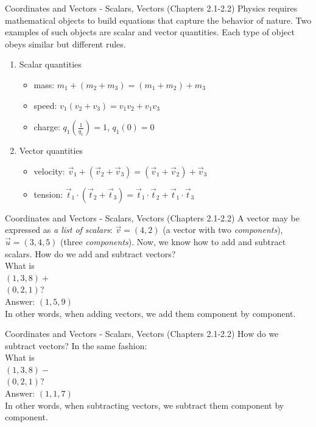 \documentclass{beamer}
\begin{document}
\begin{frame}{Coordinates and Vectors - Scalars, Vectors (Chapters 2.1-2.2)}
Physics requires \alert{mathematical objects} to build equations that capture the behavior of nature.  Two examples of such objects are \alert{scalar} and \alert{vector} quantities.  Each type of object obeys similar but different rules.
\begin{enumerate}
\item Scalar quantities
\begin{itemize}
\item mass: $m_1+(m_2+m_3) = (m_1+m_2)+m_3$
\item speed: $v_1(v_2+v_3) = v_1v_2+v_1v_3$
\item charge: $q_1 \left(\frac{1}{q_1}\right) = 1$, $q_1(0) = 0$
\end{itemize}
\item Vector quantities
\begin{itemize}
\item velocity: $\vec{v}_1 + (\vec{v}_2+\vec{v}_3) = (\vec{v}_1 + \vec{v}_2)+\vec{v}_3$
\item tension: $\vec{t}_1 \cdot (\vec{t}_2 + \vec{t}_3) = \vec{t}_1 \cdot \vec{t}_2 + \vec{t}_1 \cdot \vec{t}_3$
\end{itemize}
\end{enumerate}
\end{frame}

\begin{frame}{Coordinates and Vectors - Scalars, Vectors (Chapters 2.1-2.2)}
A vector may be expressed as \textit{a list of scalars}: $\vec{v} = (4,2)$ (a vector with two \textit{components}), $\vec{u} = (3,4,5)$ (three \textit{components}).  Now, we know how to add and subtract scalars.  How do we add and subtract vectors? \\
\vspace{0.5cm}
What is\\
$(1,3,8)+$\\ $(0,2,1)$? \\
Answer: $(1,5,9)$ \\
\vspace{0.5cm}
In other words, when adding vectors, we add them component by component.
\end{frame}

\begin{frame}{Coordinates and Vectors - Scalars, Vectors (Chapters 2.1-2.2)}
How do we subtract vectors? In the same fashion:\\
\vspace{0.5cm}
What is\\
$(1,3,8)-$\\ $(0,2,1)$? \\
Answer: $(1,1,7)$ \\
\vspace{0.5cm}
In other words, when subtracting vectors, we subtract them component by component.
\end{frame}
\end{document}

